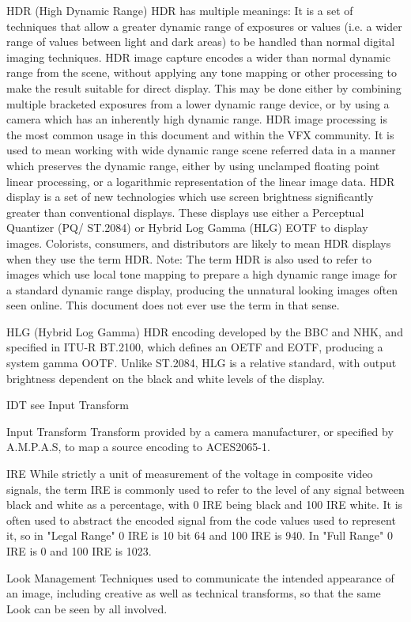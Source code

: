 HDR (High Dynamic Range)
HDR has multiple meanings: It is a set of techniques that allow a greater dynamic range of exposures or values (i.e. a wider range of values between light and dark areas) to be handled than normal digital imaging techniques.
HDR image capture encodes a wider than normal dynamic range from the scene, without applying any tone mapping or other processing to make the result suitable for direct display. This may be done either by combining multiple bracketed exposures from a lower dynamic range device, or by using a camera which has an inherently high dynamic range.
HDR image processing is the most common usage in this document and within the VFX community. It is used to mean working with wide dynamic range scene referred data in a manner which preserves the dynamic range, either by using unclamped floating point linear processing, or a logarithmic representation of the linear image data.
HDR display is a set of new technologies which use screen brightness significantly greater than conventional displays. These displays use either a Perceptual Quantizer (PQ/ ST.2084) or Hybrid Log Gamma (HLG) EOTF to display images. Colorists, consumers, and distributors are likely to mean HDR displays when they use the term HDR.
Note: The term HDR is also used to refer to images which use local tone mapping to prepare a high dynamic range image for a standard dynamic range display, producing the unnatural looking images often seen online. This document does not ever use the term in that sense.

HLG (Hybrid Log Gamma)
HDR encoding developed by the BBC and NHK, and specified in ITU-R BT.2100, which defines an OETF and EOTF, producing a system gamma OOTF. Unlike ST.2084, HLG is a relative standard, with output brightness dependent on the black and white levels of the display.

IDT see Input Transform

Input Transform
Transform provided by a camera manufacturer, or specified by A.M.P.A.S, to map a source encoding to ACES2065-1.

IRE
While strictly a unit of measurement of the voltage in composite video signals, the term IRE is commonly used to refer to the level of any signal between black and white as a percentage, with 0 IRE being black and 100 IRE white. It is often used to abstract the encoded signal from the code values used to represent it, so in "Legal Range" 0 IRE is 10 bit 64 and 100 IRE is 940. In "Full Range" 0 IRE is 0 and 100 IRE is 1023.

Look Management
Techniques used to communicate the intended appearance of an image, including creative as well as technical transforms, so that the same Look can be seen by all involved.

